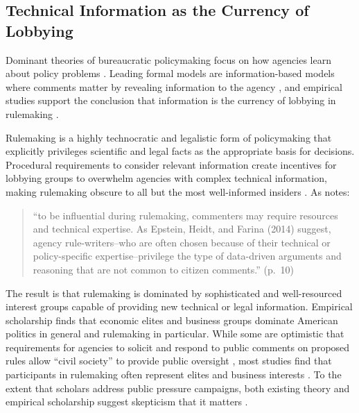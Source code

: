 \documentclass[
      12pt,
        ]{article}
\begin{document}
\hypertarget{technical-information-as-the-currency-of-lobbying}{%
\subsection{Technical Information as the Currency of Lobbying}\label{technical-information-as-the-currency-of-lobbying}}

Dominant theories of bureaucratic policymaking focus on how agencies learn about policy problems \citep{Kerwin2011}. Leading formal models are information-based models where comments matter by revealing information to the agency \citep{Gailmard2017, Libgober2018}, and empirical studies support the conclusion that information is the currency of lobbying in rulemaking \citep{Yackee2012, Cook2017, Gordon2018, Walters2019}.

Rulemaking is a highly technocratic and legalistic form of policymaking that explicitly privileges scientific and legal facts as the appropriate basis for decisions. Procedural requirements to consider relevant information create incentives for lobbying groups to overwhelm agencies with complex technical information, making rulemaking obscure to all but the most well-informed insiders \citep{Wagner2010}.
As \citet{Yackee2019} notes:

\begin{quote}
``to be influential during rulemaking,
commenters may require resources and technical expertise.
As Epstein, Heidt, and Farina (2014) suggest, agency rule-writers--who are often chosen because
of their technical or policy-specific expertise--privilege the type of data-driven
arguments and reasoning that are not common to citizen comments.'' (p.~10)
\end{quote}

The result is that rulemaking is dominated by sophisticated and well-resourced interest groups capable of providing new technical or legal information. Empirical scholarship finds that economic elites and business groups
dominate American politics in general \citetext{\citealp{Jacobs2005}; \citealp{Soss2007}; \citealp[Hertel-Fernandez2019;][]{Hacker2003}; \citealp{Gilens2014}} and rulemaking in
particular. While some are optimistic that requirements for agencies to
solicit and respond to public comments on proposed rules allow ``civil
society'' to provide public oversight \citep{Michaels2015, Metzger2010}, most
studies find that participants in rulemaking often represent elites and
business interests \citep{Seifter2016UCLA, Crow2015, Wagner2011, West2009, Yackee2006JOP, Yackee2006JPART, Golden1998, Haeder2015, Cook2017, LibgoberCarpenter2018}. To the extent that scholars address public pressure campaigns, both
existing theory and empirical scholarship suggest skepticism that it
matters \citep{Balla2018}.
\end{document}
